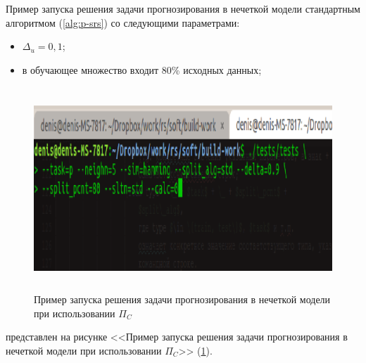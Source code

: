 Пример запуска решения задачи прогнозирования в нечеткой модели стандартным
алгоритмом (\ref{alg:p-srs}) со следующими параметрами:
\begin{itemize}
	\item $\Delta_u = 0,1$;
	\item в обучающее множество входит 80\% исходных данных;
\end{itemize}
\begin{figure}[H]
	\caption{Пример запуска решения задачи прогнозирования в нечеткой модели при
	использовании $\Pi_C$}
	\label{pic:ex-p-srs-hamming}
	\begin{center}
  \includegraphics[width=7in,height=3in]{pics/examples/p-hamming.png}
\end{center}
\end{figure}
представлен на рисунке <<Пример запуска решения задачи прогнозирования в нечеткой модели при
	использовании $\Pi_C$>> (\ref{pic:ex-p-srs-hamming}).

